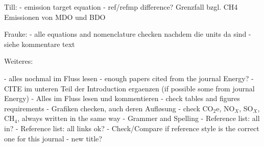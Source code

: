 Till:
- emission target equation
- ref/refmp difference? Grenzfall bzgl. CH4 Emissionen von MDO und BDO

Frauke:
- alle equations and nomenclature checken nachdem die units da sind
- siehe kommentare text

Weiteres:

- alles nochmal im Fluss lesen
- enough papers cited from the journal Energy?
- CITE im unteren Teil der Introduction ergaenzen (if possible some from journal Energy)
- Alles im Fluss lesen und kommentieren
- check tables and figures requirements
- Grafiken checken, auch deren Aufløsung
- check CO$_2$e, NO$_X$, SO$_X$, CH$_4$, always written in the same way
- Grammer and Spelling
- Reference list: all in?
- Reference list: all links ok?
- Check/Compare if reference style is the correct one for this journal
- new title?